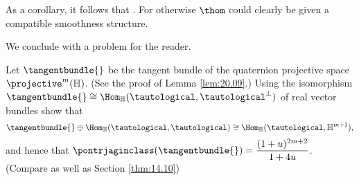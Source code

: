 \documentclass[../main]{subfiles}
\begin{document}

As a corollary, it follows that . For otherwise $\thom$ could clearly be given a compatible smoothness structure.

We conclude with a problem for the reader.

\begin{problem}\label{prob:20.A} Let $\tangentbundle{}$ be the tangent bundle of the quaternion projective space $\projective^{m}(\mathbb{H})$. (See the proof of Lemma \ref{lem:20.09}.) Using the isomorphism $\tangentbundle{} \cong \Hom_{\mathbb{H}}(\tautological, \tautological^{\perp})$ of real vector bundles show that
\[
\tangentbundle{} \oplus \Hom_{\mathbb{H}}(\tautological, \tautological) \cong \Hom_{\mathbb{H}}(\tautological, \mathbb{H}^{m+1}),
\]
and hence that $\pontrjaginclass(\tangentbundle{})=\dfrac{(1+u)^{2 m+2} }{1+4 u}$. (Compare \cite{szczarba} as well as Section \ref{thm:14.10})

\end{problem}
\end{document}
